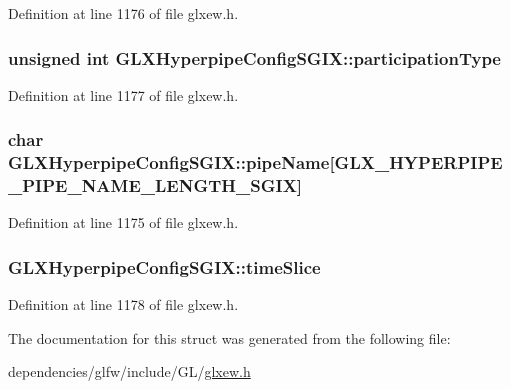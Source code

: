 Definition at line 1176 of file glxew.\-h.

\hypertarget{struct_g_l_x_hyperpipe_config_s_g_i_x_a093cfaaec305531f66e1120929b5b01b}{
\subsubsection[{participation\-Type}]{\setlength{\rightskip}{0pt plus 5cm}unsigned {\bf int} G\-L\-X\-Hyperpipe\-Config\-S\-G\-I\-X\-::participation\-Type}}\label{struct_g_l_x_hyperpipe_config_s_g_i_x_a093cfaaec305531f66e1120929b5b01b}


Definition at line 1177 of file glxew.\-h.

\hypertarget{struct_g_l_x_hyperpipe_config_s_g_i_x_a9e3748f92005cac81cb44d4c67acccb8}{
\subsubsection[{pipe\-Name}]{\setlength{\rightskip}{0pt plus 5cm}char G\-L\-X\-Hyperpipe\-Config\-S\-G\-I\-X\-::pipe\-Name\mbox{[}{\bf G\-L\-X\-\_\-\-H\-Y\-P\-E\-R\-P\-I\-P\-E\-\_\-\-P\-I\-P\-E\-\_\-\-N\-A\-M\-E\-\_\-\-L\-E\-N\-G\-T\-H\-\_\-\-S\-G\-I\-X}\mbox{]}}}\label{struct_g_l_x_hyperpipe_config_s_g_i_x_a9e3748f92005cac81cb44d4c67acccb8}


Definition at line 1175 of file glxew.\-h.

\hypertarget{struct_g_l_x_hyperpipe_config_s_g_i_x_afe9288e75dc1ae5e0f33eff978d7024d}{
\subsubsection[{time\-Slice}]{ G\-L\-X\-Hyperpipe\-Config\-S\-G\-I\-X\-::time\-Slice}}\label{struct_g_l_x_hyperpipe_config_s_g_i_x_afe9288e75dc1ae5e0f33eff978d7024d}


Definition at line 1178 of file glxew.\-h.



The documentation for this struct was generated from the following file\-:\begin{DoxyCompactItemize}
\item 
dependencies/glfw/include/\-G\-L/\hyperlink{glxew_8h}{glxew.\-h}\end{DoxyCompactItemize}
